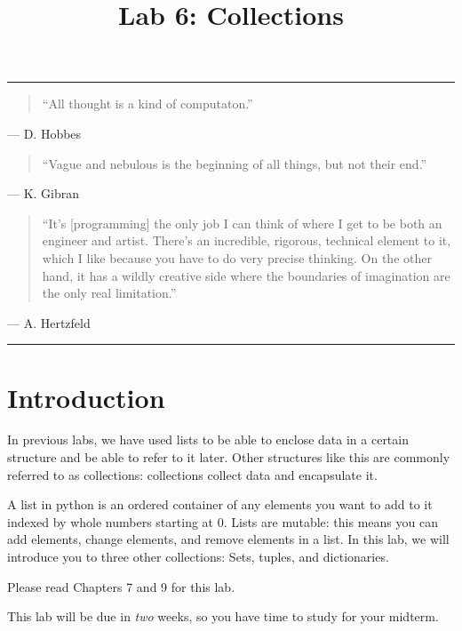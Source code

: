 \documentclass[11pt]{cselabheader}
\title{Lab 6: Collections}
\begin{document}
\maketitle

\hrule
\begin{quotation}
``All thought is a kind of computaton.''
\end{quotation}
\begin{flushright}
--- D. Hobbes
\end{flushright}

\begin{quotation}
``Vague and nebulous is the beginning of all things, but not their end.''
\end{quotation}
\begin{flushright}
--- K. Gibran
\end{flushright}

\begin{quotation}
``It's [programming] the only job I can think of where I get to be both an
engineer and artist. There's an incredible, rigorous, technical element to it,
which I like because you have to do very precise thinking. On the other hand, it
has a wildly creative side where the boundaries of imagination are the only real
limitation.''
\end{quotation}
\begin{flushright}
--- A. Hertzfeld
\end{flushright}

\hrule

\section{Introduction}

In previous labs, we have used lists to be able to enclose data in a certain
structure and be able to refer to it later. Other structures like this are
commonly referred to as collections: collections collect data and encapsulate
it.

A list in python is an ordered container of any elements you want to add to it
indexed by whole numbers starting at 0. Lists are mutable: this means you can
add elements, change elements, and remove elements in a list. In this lab, we
will introduce you to three other collections: Sets, tuples, and
dictionaries. 

Please read Chapters 7 and 9 for this lab.

This lab will be due in \emph{two} weeks, so you have time to study for your
midterm.
\end{document}
